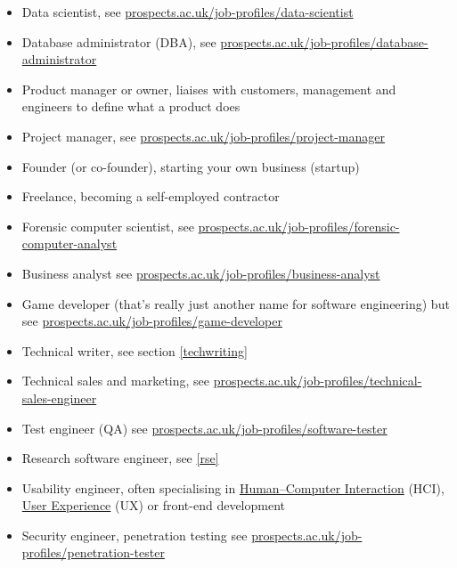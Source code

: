 \documentclass[
]{book}
\providecommand{\tightlist}{%
  \setlength{\itemsep}{0pt}\setlength{\parskip}{0pt}}
\begin{document}
\begin{itemize}
\tightlist
\item
  Data scientist, see \href{https://www.prospects.ac.uk/job-profiles/data-scientist}{prospects.ac.uk/job-profiles/data-scientist}
\item
  Database administrator (DBA), see \href{https://www.prospects.ac.uk/job-profiles/database-administrator}{prospects.ac.uk/job-profiles/database-administrator}
\item
  Product manager or owner, liaises with customers, management and engineers to define what a product does
\item
  Project manager, see \href{https://www.prospects.ac.uk/job-profiles/project-manager}{prospects.ac.uk/job-profiles/project-manager}
\item
  Founder (or co-founder), starting your own business (startup)
\item
  Freelance, becoming a self-employed contractor
\item
  Forensic computer scientist, see \href{https://www.prospects.ac.uk/job-profiles/forensic-computer-analyst}{prospects.ac.uk/job-profiles/forensic-computer-analyst}
\item
  Business analyst see \href{https://www.prospects.ac.uk/job-profiles/business-analyst}{prospects.ac.uk/job-profiles/business-analyst}
\item
  Game developer (that's really just another name for software engineering) but see \href{https://www.prospects.ac.uk/job-profiles/game-developer}{prospects.ac.uk/job-profiles/game-developer}
\item
  Technical writer, see section \ref{techwriting}
\item
  Technical sales and marketing, see \href{https://www.prospects.ac.uk/job-profiles/technical-sales-engineer}{prospects.ac.uk/job-profiles/technical-sales-engineer}
\item
  Test engineer (QA) see \href{https://www.prospects.ac.uk/job-profiles/software-tester}{prospects.ac.uk/job-profiles/software-tester}
\item
  Research software engineer, see \ref{rse}
\item
  Usability engineer, often specialising in \href{https://en.wikipedia.org/wiki/Human\%E2\%80\%93computer_interaction}{Human--Computer Interaction} (HCI), \href{https://en.wikipedia.org/wiki/User_experience}{User Experience} (UX) or front-end development
\item
  Security engineer, penetration testing see \href{https://www.prospects.ac.uk/job-profiles/penetration-tester}{prospects.ac.uk/job-profiles/penetration-tester}

\end{itemize}
\end{document}
